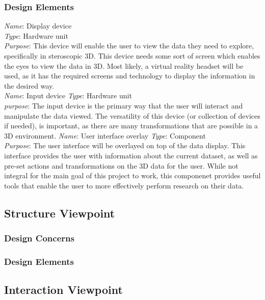 \documentclass{article}
\begin{document}
\subsubsection{Design Elements}

        \textit{Name}: Display device\\
        \textit{Type}: Hardware unit\\
        \textit{Purpose}: This device will enable the user to view the data they need to explore, specifically in steroscopic 3D. 
        This device needs some sort of screen which enables the eyes to view the data in 3D. Most likely, a virtual reality headset
        will be used, as it has the required screens and technology to display the information in the desired way.\\
\newline
        \textit{Name}: Input device
        \textit{Type}: Hardware unit\\
        \textit{purpose}: The input device is the primary way that the user will interact and manipulate the data viewed. 
        The versatility of this device (or collection of devices if needed), is important, as there are many transformations
        that are possible in a 3D environment. 
\newline
        \textit{Name}: User interface overlay
        \textit{Type}: Component\\
        \textit{Purpose}: The user interface will be overlayed on top of the data display. This interface provides
        the user with information about the current dataset, as well as pre-set actions and transformations on the 
        3D data for the user. While not integral for the main goal of this project to work, this componenet provides
        useful tools that enable the user to more effectively perform research on their data.

\subsection{Structure Viewpoint}


\subsubsection{Design Concerns}
\subsubsection{Design Elements}

\subsection{Interaction Viewpoint}
\end{document}
